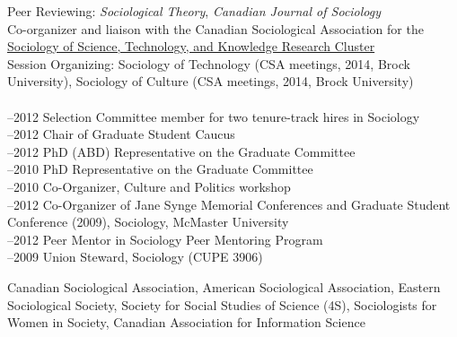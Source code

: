\documentclass[11pt,usenames,dvipsnames]{article}
\begin{document}
\noindent Peer Reviewing: {\it Sociological Theory}, {\it Canadian Journal of Sociology}\\

\noindent Co-organizer and liaison with the Canadian Sociological Association for the \href{http://www.csa-scs.ca/files/webapps/csapress/stsk/}{Sociology of Science, Technology, and Knowledge Research Cluster}\\

\noindent Session Organizing: Sociology of Technology (CSA meetings, 2014, Brock University), Sociology of Culture (CSA meetings, 2014, Brock University) \\

\\
–2012 Selection Committee member for two tenure-track hires in Sociology\\
–2012 Chair of Graduate Student Caucus\\
–2012 PhD (ABD) Representative on the Graduate Committee\\
–2010 PhD Representative on the Graduate Committee\\
–2010 Co-Organizer, Culture and Politics workshop\\
–2012 Co-Organizer of Jane Synge Memorial Conferences and Graduate Student Conference (2009), Sociology, McMaster University\\
–2012 Peer Mentor in Sociology Peer Mentoring Program\\
–2009 Union Steward, Sociology (CUPE 3906)\\



\noindent Canadian Sociological Association, American Sociological Association, Eastern Sociological Society, Society for Social Studies of Science (4S), Sociologists for Women in Society, Canadian Association for Information Science \\

\end{document}
